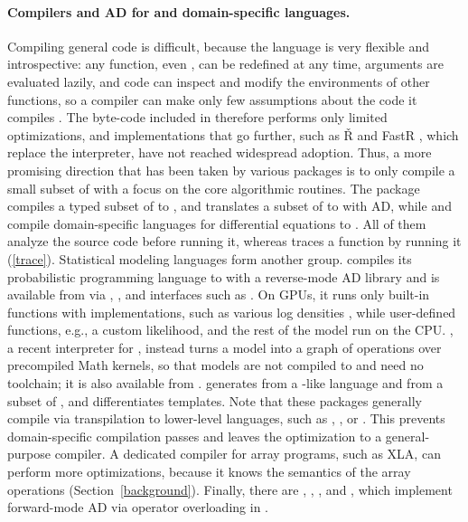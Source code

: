 \documentclass[article,shortnames]{jss}
\begin{document}
\paragraph{Compilers and AD for  and domain-specific languages.}
Compiling general  code is difficult, because the language is very flexible and introspective: any function, even \code{+}, can be redefined at any time, arguments are evaluated lazily, and code can inspect and modify the environments of other functions, so a compiler can make only few assumptions about the code it compiles \citep{ref-evaluating-r}.
The byte-code  included in  \citep{ref-r} therefore performs only limited optimizations, and implementations that go further, such as \v{R} \citep{ref-rir} and FastR \citep{ref-fastr}, which replace the  interpreter, have not reached widespread adoption.
Thus, a more promising direction that has been taken by various packages is to only compile a small subset of  with a focus on the core algorithmic routines.
The  package  \citep{ref-quickr} compiles a typed subset of  to , and  \citep{ref-ast2ast} translates a subset of  to  with AD, while  \citep{ref-odin} and  \citep{ref-rxode2} compile domain-specific languages for differential equations to .
All of them analyze the source code before running it, whereas  traces a function by running it (\cref{trace}).
Statistical modeling languages form another group.
 \citep{ref-stan} compiles its probabilistic programming language to  with a reverse-mode AD library \citep{ref-stanmath} and is available from  via ,  \citep{ref-cmdstanr}, and interfaces such as  \citep{ref-brms}.
On GPUs, it runs only built-in functions with  implementations, such as various log densities \citep{ref-stan-guide}, while user-defined functions, e.g., a custom likelihood, and the rest of the model run on the CPU.
 \citep{ref-stanli}, a recent interpreter for , instead turns a model into a graph of operations over precompiled  Math kernels, so that models are not compiled to  and need no toolchain; it is also available from .
 \citep{ref-nimble} generates  from a -like language \citep{ref-bugs} and from a subset of , and  \citep{ref-tmb} differentiates  templates.
Note that these packages generally compile via transpilation to lower-level languages, such as , , or .
This prevents domain-specific compilation passes and leaves the optimization to a general-purpose compiler.
A dedicated compiler for array programs, such as XLA, can perform more optimizations, because it knows the semantics of the array operations (Section~\ref{background}).
Finally, there are  \citep{ref-dual},  \citep{ref-madness},  \citep{ref-nabla}, and  \citep{ref-salad}, which implement forward-mode AD via operator overloading in .
\end{document}
